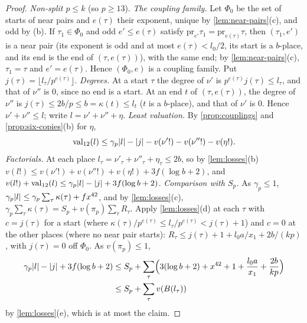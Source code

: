\begin{proof}
\emph{Non-split $p\le k$} (so $p\ge13$). \emph{The coupling family.} Let $\Phi_0$ be the set of starts of near pairs and $e(\tau)$ their exponent, unique by \cref{lem:near-pairs}(c), and odd by (b). If $\tau_1\in\Phi_0$ and odd $e'\le e(\tau)$ satisfy $\mathrm{pr}_{e'}\tau_1=\mathrm{pr}_{e(\tau)}\tau$, then $(\tau_1,e')$ is a near pair (its exponent is odd and at most $e(\tau)<l_0/2$, its start is a $b$-place, and its end is the end of $(\tau,e(\tau))$), with the same end; by \cref{lem:near-pairs}(c), $\tau_1=\tau$ and $e'=e(\tau)$. Hence $(\Phi_0,e)$ is a coupling family. Put $j(\tau)=\lfloor l_\tau/p^{e(\tau)}\rfloor$. \emph{Degrees.} At a start $\tau$ the degree of $\nu'$ is $p^{e(\tau)}j(\tau)\le l_\tau$, and that of $\nu''$ is $0$, since no end is a start. At an end $t$ of $(\tau,e(\tau))$, the degree of $\nu''$ is $j(\tau)\le2b/p\le b=\kappa(t)\le l_t$ ($t$ is a $b$-place), and that of $\nu'$ is $0$. Hence $\nu'+\nu''\le l$; write $l=\nu'+\nu''+\eta$. \emph{Least valuation.} By \cref{prop:couplings} and \cref{prop:six-copies}(b) for $\eta$,
\[
  \mathrm{val}_{12}(l)\le\gamma_p\lvert l\rvert-\lvert j\rvert-v(\nu'!)-v(\nu''!)-v(\eta!) .
\]
\emph{Factorials.} At each place $l_\tau=\nu'_\tau+\nu''_\tau+\eta_\tau\le2b$, so by \cref{lem:losses}(b) $v(l!)\le v(\nu'!)+v(\nu''!)+v(\eta!)+3f(\log b+2)$, and $v(l!)+\mathrm{val}_{12}(l)\le\gamma_p\lvert l\rvert-\lvert j\rvert+3f(\log b+2)$. \emph{Comparison with $S_p$.} As $\gamma_p\le1$, $\gamma_p\lvert l\rvert\le\gamma_p\sum_\tau\kappa(\tau)+fx^{42}$, and by \cref{lem:losses}(c), $\gamma_p\sum_\tau\kappa(\tau)=S_p+v(\pi_p)\sum_\tau R_\tau$. Apply \cref{lem:losses}(d) at each $\tau$ with $c=j(\tau)$ for a start (where $\kappa(\tau)/p^{e(\tau)}\le l_\tau/p^{e(\tau)}<j(\tau)+1$) and $c=0$ at the other places (where no near pair starts): $R_\tau\le j(\tau)+1+l_0a/x_1+2b/(kp)$, with $j(\tau)=0$ off $\Phi_0$. As $v(\pi_p)\le1$,
\begin{align*}
  \gamma_p\lvert l\rvert-\lvert j\rvert+3f(\log b+2)&\le S_p+\sum_\tau\Bigl(3(\log b+2)+x^{42}+1+\frac{l_0a}{x_1}+\frac{2b}{kp}\Bigr)\\
  &\le S_p+\sum_\tau v(B(l_\tau))
\end{align*}
by \cref{lem:losses}(e), which is at most the claim.
\end{proof}

